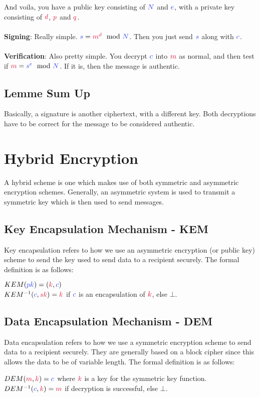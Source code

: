 	And voila, you have a public key consisting of $\cN$ and $\ce$, with a private key consisting of $\cd$, $\cp$ and $\cq$.\\
	\\
	\textbf{Signing}:
	Really simple. $\csig = \cm^{\cd}\mod \cN$. Then you just send $\csig$ along with $\cc$.\\
	\\
	\textbf{Verification}:
	Also pretty simple. You decrypt $\cc$ into $\cm$ as normal, and then test if $\cm = \csig^{\ce}\mod \cN$. If it is, then the message is authentic.

	\subsection{Lemme Sum Up}
	Basically, a signature is another ciphertext, with a different key. %
	Both decryptions have to be correct for the message to be considered authentic.

\section{Hybrid Encryption}
	A hybrid scheme is one which makes use of both symmetric and asymmetric encryption schemes. Generally, an asymmetric system is used to transmit a symmetric key which is then used to send messages.\\

	\subsection{Key Encapsulation Mechanism - KEM}
		Key encapsulation refers to how we use an asymmetric encryption (or public key) scheme to send the key used to send data to a recipient securely. The formal definition is as follows:
		\begin{center}
			$KEM(\cpk) = (\cK,\cc)$\\
			$KEM^{-1}(\cc, \csk) = \cK$ \quad if $\cc$ is an encapsulation of $\cK$, else $\bot$.
		\end{center}

	\subsection{Data Encapsulation Mechanism - DEM}
		Data encapsulation refers to how we use a symmetric encryption scheme to send data to a recipient securely. They are generally based on a block cipher since this allows the data to be of variable length. The formal definition is as follows:
		\begin{center}
			$DEM(\cm,\cK) = \cc$ \quad where $\cK$ is a key for the symmetric key function.\\
			$DEM^{-1}(\cc,\ck) = \cm $ \quad if decryption is successful, else $\bot$.
		\end{center}


